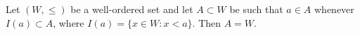 Let \((W, \leq)\) be a well-ordered set and let \(A \subset W\) be such that \(a \in A\) whenever \(I(a) \subset A\), where \(I(a) = \{x \in W : x < a\}\). Then \(A = W\).